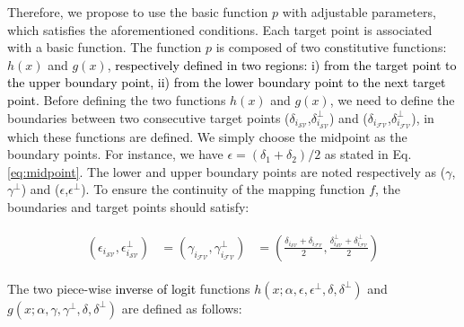 Therefore, we propose to use the basic function $p$ with adjustable parameters, which satisfies the aforementioned conditions. %
Each target point is associated with a basic function. 
The function $p$ is composed of two constitutive functions: $h(x)$ and $g(x)$, \textcolor{black}{respectively defined in two regions: i) from the target point to the upper boundary point, ii) from the lower boundary point to the next target point. }%
Before defining the two functions $h(x)$ and $g(x)$, we need to define the boundaries between two consecutive target points  ($\delta_{i_{{\mathcal{SV}}}}$,$\delta^{\perp}_{i_{{\mathcal{SV}}}}$) and ($\delta_{i_{{\mathcal{FV}}}}$,$\delta^{\perp}_{i_{{\mathcal{FV}}}}$), in which these functions are defined.%
We simply choose the midpoint as the boundary points. For instance, we have $\epsilon=(\delta_1+\delta_2)/2$ %
as stated in Eq. \ref{eq:midpoint}.
The lower and upper boundary points are noted respectively as ($\gamma$,$\gamma^{\perp}$) and ($\epsilon$,$\epsilon^{\perp}$). To ensure the continuity of the mapping function $f$, the boundaries and target points should satisfy:
 

\begin{align}
\label{eq:midpoint}
\begin{aligned}
(\epsilon_{i_{{\mathcal{SV}}}},\epsilon^{\perp}_{i_{{\mathcal{SV}}}}) &=
(\gamma_{i_{{\mathcal{FV}}}},\gamma^{\perp}_{i_{{\mathcal{FV}}}}) &=
(\frac{\delta_{i_{{\mathcal{SV}}}} + \delta_{i_{{\mathcal{FV}}}}}{2}, \frac{\delta^{\perp}_{i_{{\mathcal{SV}}}} + \delta^{\perp}_{i_{{\mathcal{FV}}}}}{2})
\end{aligned}
\end{align}

The two piece-wise \textcolor{black}{inverse of logit} functions $h(x;\alpha,\epsilon,\epsilon^{\perp},\delta,\delta^{\perp})$ and $g(x;\alpha,\gamma,\gamma^{\perp},\delta,\delta^{\perp})$ are defined as follows:%

